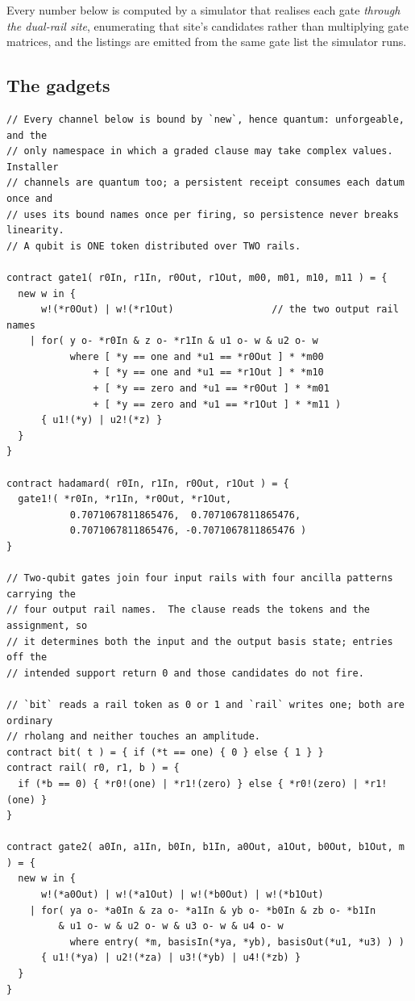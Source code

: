 \documentclass[11pt,a4paper]{article}
\theoremstyle{plain}
\theoremstyle{definition}
\theoremstyle{remark}
\begin{document}
Every number below is computed by a simulator that realises each gate
\emph{through the dual-rail site}, enumerating that site's candidates rather
than multiplying gate matrices, and the listings are emitted from the same gate
list the simulator runs.

\subsection{The gadgets}

\begin{lstlisting}
// Every channel below is bound by `new`, hence quantum: unforgeable, and the
// only namespace in which a graded clause may take complex values.  Installer
// channels are quantum too; a persistent receipt consumes each datum once and
// uses its bound names once per firing, so persistence never breaks linearity.
// A qubit is ONE token distributed over TWO rails.

contract gate1( r0In, r1In, r0Out, r1Out, m00, m01, m10, m11 ) = {
  new w in {
      w!(*r0Out) | w!(*r1Out)                 // the two output rail names
    | for( y o- *r0In & z o- *r1In & u1 o- w & u2 o- w
           where [ *y == one and *u1 == *r0Out ] * *m00
               + [ *y == one and *u1 == *r1Out ] * *m10
               + [ *y == zero and *u1 == *r0Out ] * *m01
               + [ *y == zero and *u1 == *r1Out ] * *m11 )
      { u1!(*y) | u2!(*z) }
  }
}

contract hadamard( r0In, r1In, r0Out, r1Out ) = {
  gate1!( *r0In, *r1In, *r0Out, *r1Out,
           0.7071067811865476,  0.7071067811865476,
           0.7071067811865476, -0.7071067811865476 )
}

// Two-qubit gates join four input rails with four ancilla patterns carrying the
// four output rail names.  The clause reads the tokens and the assignment, so
// it determines both the input and the output basis state; entries off the
// intended support return 0 and those candidates do not fire.

// `bit` reads a rail token as 0 or 1 and `rail` writes one; both are ordinary
// rholang and neither touches an amplitude.
contract bit( t ) = { if (*t == one) { 0 } else { 1 } }
contract rail( r0, r1, b ) = {
  if (*b == 0) { *r0!(one) | *r1!(zero) } else { *r0!(zero) | *r1!(one) }
}

contract gate2( a0In, a1In, b0In, b1In, a0Out, a1Out, b0Out, b1Out, m ) = {
  new w in {
      w!(*a0Out) | w!(*a1Out) | w!(*b0Out) | w!(*b1Out)
    | for( ya o- *a0In & za o- *a1In & yb o- *b0In & zb o- *b1In
         & u1 o- w & u2 o- w & u3 o- w & u4 o- w
           where entry( *m, basisIn(*ya, *yb), basisOut(*u1, *u3) ) )
      { u1!(*ya) | u2!(*za) | u3!(*yb) | u4!(*zb) }
  }
}
\end{lstlisting}
\end{document}
